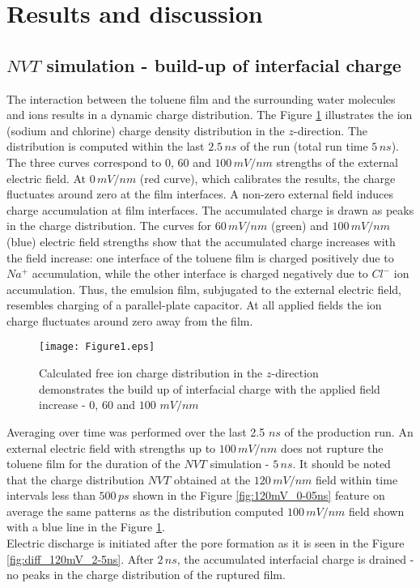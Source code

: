 \section{Results and discussion}
\subsection{$NVT$ simulation - build-up of interfacial charge}
The interaction between the toluene film and the surrounding water molecules and ions results in a dynamic charge distribution. The Figure \ref{fig:nvt_charges_all_voltage} illustrates the ion (sodium and chlorine) charge density  distribution in the $z$-direction. The distribution is computed within the last $2.5\, ns$ of the run (total run time $5\, ns$).  The three curves correspond to  $0$, $60$ and $100\, mV/nm$ strengths of the external electric field. At $0\, mV/nm$ (red curve), which calibrates the results, the charge  fluctuates around zero at the film interfaces. A non-zero external field induces charge accumulation at film interfaces. The accumulated charge is drawn as peaks in the charge distribution. The curves for  $60\, mV/nm$  (green) and $100\, mV/nm$ (blue) electric field strengths show that the accumulated charge increases with the  field increase: one interface of the toluene film is charged positively due to $Na^+$ accumulation, while the other interface  is charged negatively due to  $Cl^-$ ion accumulation.  Thus, the emulsion film, subjugated to the external electric field, resembles charging of a parallel-plate capacitor. At all applied fields the ion charge fluctuates around zero away from the film. 


\begin{figure}[ht]
\begin{center}
\texttt{[image: Figure1.eps]}
\end{center}
\caption{Calculated free ion charge distribution in the $z$-direction demonstrates the build up of interfacial charge with the applied field increase - $0$, $60$ and $100$ $mV/nm$  }
\label{fig:nvt_charges_all_voltage}
\end{figure}

Averaging over time was performed over the last 2.5 $ns$ of the production run.
An external electric field with strengths up to $100\, mV/nm$ does not rupture the toluene film for  the duration of the $NVT$ simulation -  $5\, ns$. 
It should be noted that the  charge distribution $NVT$ obtained at the $120\, mV/nm$ field within time intervals less than $500\, ps$  shown in the Figure \ref{fig:120mV_0-05ns} feature on average the same patterns as the distribution computed   $100\, mV/nm$ field shown with a blue line in the Figure \ref{fig:nvt_charges_all_voltage}.\\
Electric discharge is initiated after the pore formation as it is seen in the Figure \ref{fig:diff_120mV_2-5ns}. After $2\, ns$, the accumulated interfacial charge is drained - no peaks in the charge distribution of the ruptured film. 

